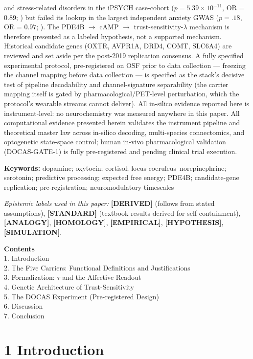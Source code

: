 \documentclass[
]{article}
\begin{document}
and stress-related disorders in the iPSYCH case-cohort
(\(p = 5.39 \times 10^{-11}\), OR = 0.89; ) but failed its lookup in the
largest independent anxiety GWAS (\(p = .18\), OR = 0.97; ). The PDE4B
\(\to\) cAMP \(\to\) trust-sensitivity-\(\lambda\) mechanism is
therefore presented as a labeled hypothesis, not a supported mechanism.
Historical candidate genes (OXTR, AVPR1A, DRD4, COMT, SLC6A4) are
reviewed and set aside per the post-2019 replication consensus. A fully
specified experimental protocol, pre-registered on OSF prior to data
collection --- freezing the channel mapping before data collection ---
is specified as the stack's decisive test of pipeline decodability and
channel-signature separability (the carrier mapping itself is gated by
pharmacological/PET-level perturbation, which the protocol's wearable
streams cannot deliver). All in-silico evidence reported here is
instrument-level: no neurochemistry was measured anywhere in this paper.
All computational evidence presented herein validates the instrument
pipeline and theoretical master law across in-silico decoding,
multi-species connectomics, and optogenetic state-space control; human
in-vivo pharmacological validation (DOCAS-GATE-1) is fully
pre-registered and pending clinical trial execution.

\textbf{Keywords:} dopamine; oxytocin; cortisol; locus
coeruleus--norepinephrine; serotonin; predictive processing; expected
free energy; PDE4B; candidate-gene replication; pre-registration;
neuromodulatory timescales

\emph{Epistemic labels used in this paper:} \textbf{{[}DERIVED{]}}
(follows from stated assumptions), \textbf{{[}STANDARD{]}} (textbook
results derived for self-containment), \textbf{{[}ANALOGY{]}},
\textbf{{[}HOMOLOGY{]}}, \textbf{{[}EMPIRICAL{]}},
\textbf{{[}HYPOTHESIS{]}}, \textbf{{[}SIMULATION{]}}.

\textbf{Contents}\\
1. Introduction\\
2. The Five Carriers: Functional Definitions and Justifications\\
3. Formalization: \(\tau\) and the Affective Readout\\
4. Genetic Architecture of Trust-Sensitivity\\
5. The DOCAS Experiment (Pre-registered Design)\\
6. Discussion\\
7. Conclusion\\

\section{1 Introduction}\label{introduction}
\end{document}
